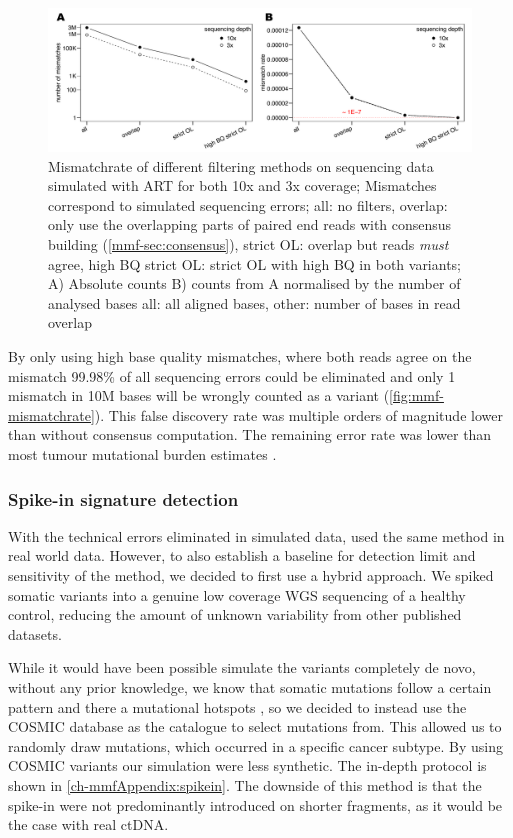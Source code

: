 \begin{figure}[ht]
\centering
\includegraphics[width=.99\linewidth]{Figures/MisMatchFinder/mismatchrateCleanSequencing.pdf}
\caption[Mismatchrate of different filtering methods]{Mismatchrate of different filtering methods on sequencing data simulated with ART\cite{Huang2011} for both 10x and 3x coverage; Mismatches correspond to simulated sequencing errors; all: no filters, overlap: only use the overlapping parts of paired end reads with consensus building (\protect\autoref{mmf-sec:consensus}), strict OL: overlap but reads \emph{must} agree, high BQ strict OL: strict OL with high BQ in both variants; A) Absolute counts B) counts from A normalised by the number of analysed bases all: all aligned bases, other: number of bases in read overlap}\label{fig:mmf-mismatchrate}
\end{figure}

By only using high base quality mismatches, where both reads agree on the mismatch 99.98\% of all sequencing errors could be eliminated and only 1 mismatch in 10M bases will be wrongly counted as a variant (\autoref{fig:mmf-mismatchrate}). This false discovery rate was multiple orders of magnitude lower than without consensus computation. The remaining error rate was lower than most tumour mutational burden estimates \cite{Alexandrov2020,Lawrence2013a}.


\subsubsection{Spike-in signature detection}
\label{mmf-sec:simSingnatures}
With the technical errors eliminated in simulated data, used the same method in real world data. However, to also establish a baseline for detection limit and sensitivity of the method, we decided to first use a hybrid approach. We spiked somatic variants into a genuine low coverage WGS sequencing of a healthy control, reducing the amount of unknown variability from other published datasets.

While it would have been possible simulate the variants completely de novo, without any prior knowledge, we know that somatic mutations follow a certain pattern and there a mutational hotspots \cite{Chen2016,Moore2021}, so we decided to instead use the COSMIC database \cite{Tate2018,WSI2021} as the catalogue to select mutations from. This allowed us to randomly draw mutations, which occurred in a specific cancer subtype. By using COSMIC variants our simulation were less synthetic. The in-depth protocol is shown in \autoref{ch-mmfAppendix:spikein}. The downside of this method is that the spike-in were not predominantly introduced on shorter fragments, as it would be the case with real ctDNA. 

